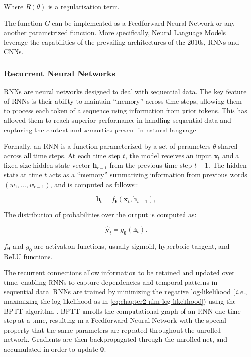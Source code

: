 \noindent Where $R(\theta)$ is a regularization term.

The function $G$ can be implemented as a Feedforward Neural Network or any another parametrized function. More specifically, Neural Language Models leverage the capabilities of the prevailing architectures of the 2010s, \acp{RNN} and \acp{CNN}.


\subsubsection{Recurrent Neural Networks}

\acp{RNN} are neural networks designed to deal with sequential data. The key feature of \acp{RNN} is their ability to maintain “memory” across time steps, allowing them to process each token of a sequence using information from prior tokens. This has allowed them to reach superior performance in handling sequential data and capturing the context and semantics present in natural language.  

\noindent Formally, an \ac{RNN} is a function parameterized by a set of parameters $\theta$ shared across all time steps. At each time step $t$, the model receives an input $\bm{x}_t$ and a fixed-size hidden state vector $\bm{h}_{t-1}$ from the previous time step $t-1$. The hidden state at time $t$ acts as a “memory” summarizing information from previous words $(w_1, \ldots, w_{t-1})$, and is computed as follows::

\begin{equation}
    \bm{h}_{t} = f_{\bm{\theta}}(\bm{x}_t, \bm{h}_{t-1}),  
\end{equation}

The distribution of probabilities over the output is computed as:

\begin{equation}
    \hat{\bm{y}}_t = g_{\bm{\theta}}(\bm{h}_t).
\end{equation}

\noindent $f_{\bm{\theta}}$ and $g_{\bm{\theta}}$ are activation functions, usually sigmoid, hyperbolic tangent, and \ac{ReLU} functions.

The recurrent connections allow information to be retained and updated over time, enabling \acp{RNN} to capture dependencies and temporal patterns in sequential data. \acp{RNN} are trained by minimizing the negative log-likelihood (\textit{i.e.}, maximizing the log-likelihood as in \ref{eq:chapter2-nlm-log-likelihood}) using the \ac{BPTT} algorithm \citep{werbos1990backpropagation}. \ac{BPTT} unrolls the computational graph of an \ac{RNN} one time step at a time, resulting in a Feedforward Neural Network with the special property that the same parameters are repeated throughout the unrolled network. Gradients are then backpropagated through the unrolled net, and accumulated in order to update $\bm{\theta}$. 

